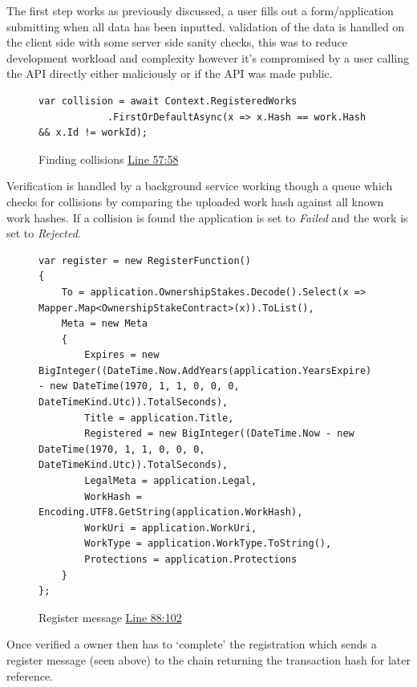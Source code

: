 The first step works as previously discussed, a user fills out a form/application submitting when all data has been inputted. validation of the data is handled on the client side with some server side sanity checks, this was to reduce development workload and complexity however it's compromised by a user calling the API directly either maliciously or if the API was made public.

\begin{figure}[H]
\caption{Finding collisions \href{https://github.com/MrHarrisonBarker/CRPL/blob/main/CRPL.Web/Services/WorksVerificationService.cs}{Line 57:58}}
\centering
\begin{lstlisting}[language=CSharp]
var collision = await Context.RegisteredWorks
           	.FirstOrDefaultAsync(x => x.Hash == work.Hash && x.Id != workId);
\end{lstlisting}
\end{figure}

Verification is handled by a background service working though a queue which checks for collisions by comparing the uploaded work hash against all known work hashes. If a collision is found the application is set to \textit{Failed} and the work is set to \textit{Rejected}.

\begin{figure}[H]
\caption{Register message \href{https://github.com/MrHarrisonBarker/CRPL/blob/main/CRPL.Web/Services/RegistrationService.cs}{Line 88:102}}
\centering
\begin{lstlisting}[language=CSharp]
var register = new RegisterFunction()
{
	To = application.OwnershipStakes.Decode().Select(x => Mapper.Map<OwnershipStakeContract>(x)).ToList(),
	Meta = new Meta
	{
		Expires = new BigInteger((DateTime.Now.AddYears(application.YearsExpire) - new DateTime(1970, 1, 1, 0, 0, 0, DateTimeKind.Utc)).TotalSeconds),
		Title = application.Title,
		Registered = new BigInteger((DateTime.Now - new DateTime(1970, 1, 1, 0, 0, 0, DateTimeKind.Utc)).TotalSeconds),
		LegalMeta = application.Legal,
		WorkHash = Encoding.UTF8.GetString(application.WorkHash),
		WorkUri = application.WorkUri,
		WorkType = application.WorkType.ToString(),
		Protections = application.Protections
	}
};
\end{lstlisting}
\end{figure}

Once verified a  owner then has to `complete' the registration which sends a register message (seen above) to the chain returning the transaction hash for later reference.

